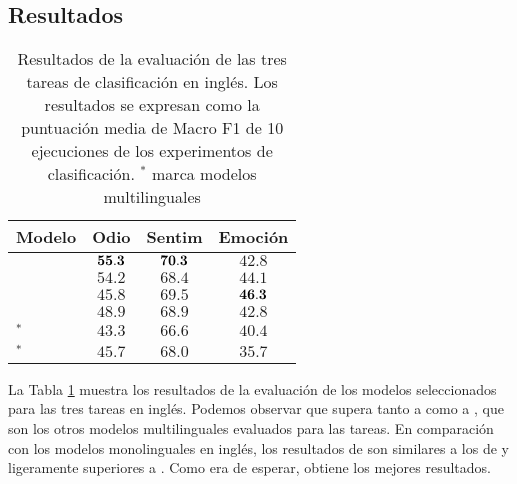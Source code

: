 \subsection{Resultados}
\begin{table}[h]
    \centering
    \begin{tabular}{lccc}
        \hline
        Modelo         & Odio     &    Sentim &  Emoción  \\
        \hline
        \bertweet{}    & $\mathbf{55.3}$ &  $\mathbf{70.3}$ &  $42.8$  \\
        \robertuito{}  & $54.2$       &  $68.4$ &  $44.1$  \\
        \roberta{}     & $45.8$       &  $69.5$ &  $\mathbf{46.3}$  \\
        \bert{}        & $48.9$       &  $68.9$ &  $42.8$  \\
        \mbert{}$^*$   & $43.3$       &  $66.6$ &  $40.4$  \\
        \xlmbase{}$^*$ & $45.7$       &  $68.0$ &  $35.7$  \\
        \hline
    \end{tabular}
    \caption{Resultados de la evaluación de las tres tareas de clasificación en inglés. Los resultados se expresan como la puntuación media de Macro F1 de 10 ejecuciones de los experimentos de clasificación. $^*$ marca modelos multilinguales}
    \label{tab:robertuito_english_results}
\end{table}

La Tabla \ref{tab:robertuito_english_results} muestra los resultados de la evaluación de los modelos seleccionados para las tres tareas en inglés. Podemos observar que \robertuito{} supera tanto a \mbert{} como a \xlm{}, que son los otros modelos multilinguales evaluados para las tareas. En comparación con los modelos monolinguales en inglés, los resultados de \robertuito{} son similares a los de \roberta{} y ligeramente superiores a \bert{}. Como era de esperar, \bertweet{} obtiene los mejores resultados.



